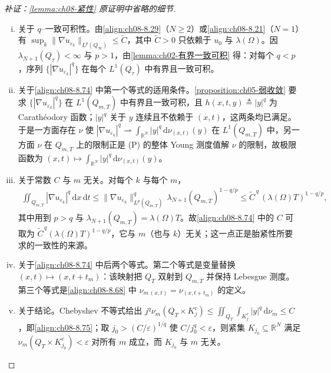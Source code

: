 \documentclass[../../main.tex]{subfiles}%
\begin{document}
\begin{proof}[补证：\cref{lemma:ch08-紧性} 原证明中省略的细节]
\begin{enumerate}[(i)]
\item 关于 $q$--一致可积性。由\eqref{align:ch08-8.29}（$N\geqslant2$）或\eqref{align:ch08-8.21}（$N=1$）有 $\sup_k\|\nabla u_{\varepsilon_k}\|_{L^p(Q_\infty)}\leqslant\widetilde C$，其中 $\widetilde C>0$ 只依赖于 $u_0$ 与 $\lambda(\Omega)$。因 $\lambda_{N+1}(Q_\tau)<\infty$ 与 $p>1$，由\cref{lemma:ch02-有界一致可积} 得：对每个 $q<p$，序列 $\{|\nabla u_{\varepsilon_k}|^q\}$ 在每个 $L^1(Q_\tau)$ 中有界且一致可积。
\item 关于\eqref{align:ch08-8.74} 中第一个等式的适用条件。\cref{proposition:ch05-弱收敛} 要求 $\{|\nabla u_{\varepsilon_k}|^q\}$ 在 $L^1(Q_{m,T})$ 中有界且一致可积，且 $h(x,t,y)\triangleq|y|^q$ 为 Carathéodory 函数；$|y|^q$ 关于 $y$ 连续且不依赖于 $(x,t)$，这两条均已满足。于是一方面存在 $\nu$ 使 $|\nabla u_{\varepsilon_k}|^q\rightharpoonup\int_{\mathbb{R}^N}|y|^q\,\mathrm{d}\nu_{(x,t)}(y)$ 在 $L^1(Q_{m,T})$ 中，另一方面 $\nu$ 在 $Q_{m,T}$ 上的限制正是 (P) 的整体 Young 测度值解 $\nu$ 的限制，故极限函数为 $(x,t)\mapsto\int_{\mathbb{R}^N}|y|^q\,\mathrm{d}\nu_{(x,t)}(y)$。
\item 关于常数 $C$ 与 $m$ 无关。对每个 $k$ 与每个 $m$，
\begin{align*}
\iint_{Q_{m,T}}|\nabla u_{\varepsilon_k}|^q\,\mathrm{d}x\,\mathrm{d}t
\leqslant\|\nabla u_{\varepsilon_k}\|^q_{L^p(Q_{m,T})}\,\lambda_{N+1}(Q_{m,T})^{1-q/p}
\leqslant\widetilde C^{\,q}\,(\lambda(\Omega)T)^{1-q/p},
\end{align*}
其中用到 $p>q$ 与 $\lambda_{N+1}(Q_{m,T})=\lambda(\Omega)T$。故\eqref{align:ch08-8.74} 中的 $C$ 可取为 $\widetilde C^{\,q}(\lambda(\Omega)T)^{1-q/p}$，它与 $m$（也与 $k$）无关；这一点正是胎紧性所要求的一致性的来源。
\item 关于\eqref{align:ch08-8.74} 中后两个等式。第二个等式是变量替换 $(x,t)\mapsto(x,t+t_m)$：该映射把 $Q_T$ 双射到 $Q_{m,T}$ 并保持 Lebesgue 测度。第三个等式是\eqref{align:ch08-8.68} 中 $\nu_{m\,(x,t)}=\nu_{(x,t+t_m)}$ 的定义。
\item 关于结论。Chebyshev 不等式给出 $j^q\nu_m(Q_T\times K_j^c)\leqslant\iint_{Q_T}\int_{K_j^c}|y|^q\,\mathrm{d}\nu_m\leqslant C$，即\eqref{align:ch08-8.75}；取 $j_0>(C/\varepsilon)^{1/q}$ 使 $C/j_0^q<\varepsilon$，则紧集 $K_{j_0}\subseteq\mathbb{R}^N$ 满足 $\nu_m(Q_T\times K_{j_0}^c)<\varepsilon$ 对所有 $m$ 成立，而 $K_{j_0}$ 与 $m$ 无关。
\end{enumerate}
\end{proof}
\end{document}
